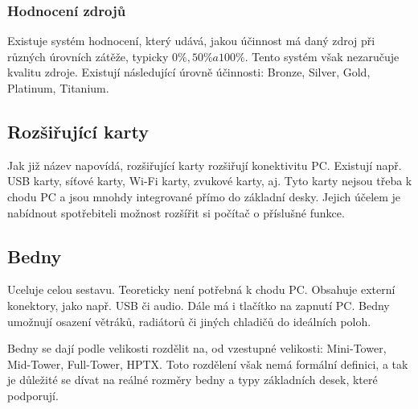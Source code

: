 \documentclass[a4paper]{article}
\begin{document}
        \subsubsection{Hodnocení zdrojů}
            Existuje systém hodnocení, který udává, jakou účinnost má daný zdroj při různých úrovních zátěže, typicky $0\%, 50\% a 100\%$. Tento systém však nezaručuje kvalitu zdroje. Existují následující úrovně účinnosti: Bronze, Silver, Gold, Platinum, Titanium.
    \subsection{Rozšiřující karty}
        Jak již název napovídá, rozšiřující karty rozšiřují konektivitu PC. Existují např. USB karty, síťové karty, Wi-Fi karty, zvukové karty, aj. Tyto karty nejsou třeba k chodu PC a jsou mnohdy integrované přímo do základní desky. Jejich účelem je nabídnout spotřebiteli možnost rozšířit si počítač o příslušné funkce.
    \subsection{Bedny}
        Uceluje celou sestavu. Teoreticky není potřebná k chodu PC. Obsahuje externí konektory, jako např. USB či audio. Dále má i tlačítko na zapnutí PC. Bedny umožnují osazení větráků, radiátorů či jiných chladičů do ideálních poloh. \par
        Bedny se dají podle velikosti rozdělit na, od vzestupné velikosti: Mini-Tower, Mid-Tower, Full-Tower, HPTX. Toto rozdělení však nemá formální definici, a tak je důležité se dívat na reálné rozměry bedny a typy základních desek, které podporují.


\newpage
\end{document}
